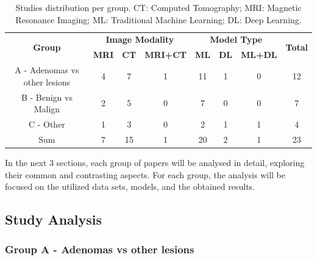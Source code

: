 \documentclass[11pt]{article}
\begin{document}
\begin{table}[]
    \centering
    \begin{tabular}{cccccccc}\toprule
        \multirow{2}{*}{\textbf{Group}} & \multicolumn{3}{c}{\textbf{Image Modality}} & \multicolumn{3}{c}{\textbf{Model Type}} & \multirow{2}{*}{\textbf{Total}}
        \\\cmidrule(lr){2-4} \cmidrule(lr){5-7}
                                        & \textbf{MRI}                                & \textbf{CT}                             & \textbf{MRI+CT}                 & \textbf{ML} & \textbf{DL} & \textbf{ML+DL}      \\\midrule
        A - Adenomas vs other lesions   & 4                                           & 7                                       & 1                               & 11          & 1           & 0              & 12 \\
        B - Benign vs Malign            & 2                                           & 5                                       & 0                               & 7           & 0           & 0              & 7  \\
        C - Other                       & 1                                           & 3                                       & 0                               & 2           & 1           & 1              & 4  \\
        Sum                             & 7                                           & 15                                      & 1                               & 20          & 2           & 1              & 23 \\
        \bottomrule
    \end{tabular}
    \caption{Studies distribution per group. CT: Computed Tomography; MRI: Magnetic Resonance Imaging; ML: Traditional Machine Learning; DL: Deep Learning.}
    \label{tab:sota_sum}
\end{table}

In the next 3 sections, each group of papers will be analysed in detail,
exploring their common and contrasting aspects. For each group, the analysis
will be focused on the utilized data sets, models, and the obtained results.

\subsection{Study Analysis}

\subsubsection{Group A - Adenomas vs other lesions}
\end{document}
